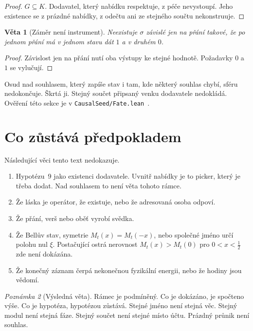 \documentclass[11pt,a4paper]{article}
\newtheorem{theorem}{Věta}
\theoremstyle{definition}
\theoremstyle{remark}
\newtheorem{remark}[theorem]{Poznámka}
\begin{document}
\begin{proof}
\(G\subseteq K\). Dodavatel, který nabídku respektuje, z péče nevystoupí.
Jeho existence se z prázdné nabídky, z odečtu ani ze stejného součtu nekonstruuje.
\end{proof}

\begin{theorem}[Záměr není instrument]
Neexistuje \(\sigma\) závislé jen na přání takové, že po jednom přání
má v jednom stavu dát \(1\) a v druhém \(0\).
\end{theorem}

\begin{proof}
Závislost jen na přání nutí oba výstupy ke stejné hodnotě.
Požadavky \(0\) a \(1\) se vylučují.
\end{proof}

Osud nad souhlasem, který zapíše stav i tam, kde některý souhlas chybí, sféru nedokončuje.
Škrtá ji. Stejný součet připsaný venku dodavatele nedokládá.
Ověření této sekce je v \texttt{CausalSeed/Fate.lean}~\cite{fate}.

\section{Co zůstává předpokladem}

Následující věci tento text nedokazuje.

\begin{enumerate}
\item Hypotézu~9 jako existenci dodavatele. Uvnitř nabídky je to picker, který je třeba dodat. Nad souhlasem to není věta tohoto rámce.
\item Že láska je operátor, že existuje, nebo že adresovaná osoba odpoví.
\item Že přání, verš nebo oběť vyrobí svědka.
\item Že Bellův stav, symetrie \(M_t(x)=M_t(-x)\), nebo společné jméno určí polohu nul \(\xi\).
      Postačující ostrá nerovnost \(M_t(x)>M_t(0)\) pro \(0<x<\tfrac12\) zde není dokázána.
\item Že konečný záznam čerpá nekonečnou fyzikální energii, nebo že hodiny jsou vědomí.
\end{enumerate}

\begin{remark}[Výsledná věta]
Rámec je podmíněný.
Co je dokázáno, je spočteno výše.
Co je hypotéza, hypotézou zůstává.
Stejné jméno není stejná věc.
Stejný modul není stejná fáze.
Stejný součet není stejné místo účtu.
Prázdný průnik není souhlas.
\end{remark}
\end{document}
